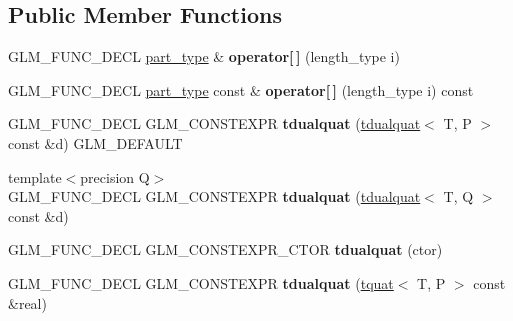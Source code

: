 \subsection*{Public Member Functions}
\begin{DoxyCompactItemize}
\item 
\mbox{\label{structglm_1_1tdualquat_a249f53dd1ed32db9b6695b10e89de1f6}} 
G\+L\+M\+\_\+\+F\+U\+N\+C\+\_\+\+D\+E\+CL \hyperlink{structglm_1_1tquat}{part\+\_\+type} \& {\bfseries operator\mbox{[}$\,$\mbox{]}} (length\+\_\+type i)
\item 
\mbox{\label{structglm_1_1tdualquat_a2243ffa45b172732765c9a473039ab72}} 
G\+L\+M\+\_\+\+F\+U\+N\+C\+\_\+\+D\+E\+CL \hyperlink{structglm_1_1tquat}{part\+\_\+type} const  \& {\bfseries operator\mbox{[}$\,$\mbox{]}} (length\+\_\+type i) const
\item 
\mbox{\label{structglm_1_1tdualquat_aaa1e073067ee609264b4943ab4397d62}} 
G\+L\+M\+\_\+\+F\+U\+N\+C\+\_\+\+D\+E\+CL G\+L\+M\+\_\+\+C\+O\+N\+S\+T\+E\+X\+PR {\bfseries tdualquat} (\hyperlink{structglm_1_1tdualquat}{tdualquat}$<$ T, P $>$ const \&d) G\+L\+M\+\_\+\+D\+E\+F\+A\+U\+LT
\item 
\mbox{\label{structglm_1_1tdualquat_af791cc456a60d3b30e0d1ec57602a44b}} 
{\footnotesize template$<$precision Q$>$ }\\G\+L\+M\+\_\+\+F\+U\+N\+C\+\_\+\+D\+E\+CL G\+L\+M\+\_\+\+C\+O\+N\+S\+T\+E\+X\+PR {\bfseries tdualquat} (\hyperlink{structglm_1_1tdualquat}{tdualquat}$<$ T, Q $>$ const \&d)
\item 
\mbox{\label{structglm_1_1tdualquat_a841e898fdd7b59f32f9de1dde3f6179d}} 
G\+L\+M\+\_\+\+F\+U\+N\+C\+\_\+\+D\+E\+CL G\+L\+M\+\_\+\+C\+O\+N\+S\+T\+E\+X\+P\+R\+\_\+\+C\+T\+OR {\bfseries tdualquat} (ctor)
\item 
\mbox{\label{structglm_1_1tdualquat_aa873fb312be8f6ca4fc1f90dabb543eb}} 
G\+L\+M\+\_\+\+F\+U\+N\+C\+\_\+\+D\+E\+CL G\+L\+M\+\_\+\+C\+O\+N\+S\+T\+E\+X\+PR {\bfseries tdualquat} (\hyperlink{structglm_1_1tquat}{tquat}$<$ T, P $>$ const \&real)
\item 
\mbox{\label{structglm_1_1tdualquat_a602d2c96a4cecb0ac2e41a4fef10bff9}} 

\end{DoxyCompactItemize}
